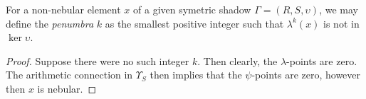\begin{propdef}
  For a non-nebular element $x$ of a given symetric shadow $\Gamma = (R, S, \upsilon)$, we may define the \emph{penumbra} $k$ as the smallest positive integer such that $\lambda^k(x)$ is not in $\ker \upsilon$. 
\end{propdef}

\begin{proof}
  Suppose there were no such integer $k$. Then clearly, the $\lambda$-points are zero. The arithmetic connection in $\Upsilon_S$ then implies that the $\psi$-points are zero, however then $x$ is nebular.
\end{proof}


  
  
  
  


